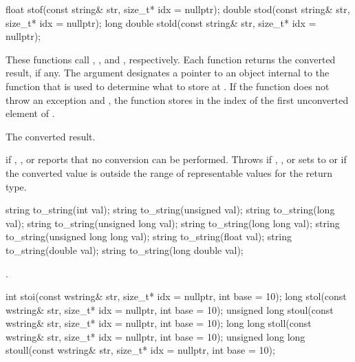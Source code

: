 %
%
%
\begin{itemdecl}
float stof(const string& str, size_t* idx = nullptr);
double stod(const string& str, size_t* idx = nullptr);
long double stold(const string& str, size_t* idx = nullptr);
\end{itemdecl}

\begin{itemdescr}
\pnum
\effects
These functions call
, , and
, respectively. Each function returns
the converted result, if any. The argument  designates a pointer to
an object internal to the function that is used to determine what to store at
. If the function does not throw an exception and ,
the function stores in  the index of the first unconverted element
of .

\pnum
\returns
The converted result.

\pnum
\throws
{} if , , or
 reports that no conversion can be performed. Throws
 if , , or
 sets  to 
or if the converted value is outside the range of representable
values for the return type.
\end{itemdescr}

%
\begin{itemdecl}
string to_string(int val);
string to_string(unsigned val);
string to_string(long val);
string to_string(unsigned long val);
string to_string(long long val);
string to_string(unsigned long long val);
string to_string(float val);
string to_string(double val);
string to_string(long double val);
\end{itemdecl}

\begin{itemdescr}
\pnum
\returns
{}.
\end{itemdescr}

%
%
%
%
%
\begin{itemdecl}
int stoi(const wstring& str, size_t* idx = nullptr, int base = 10);
long stol(const wstring& str, size_t* idx = nullptr, int base = 10);
unsigned long stoul(const wstring& str, size_t* idx = nullptr, int base = 10);
long long stoll(const wstring& str, size_t* idx = nullptr, int base = 10);
unsigned long long stoull(const wstring& str, size_t* idx = nullptr, int base = 10);
\end{itemdecl}

